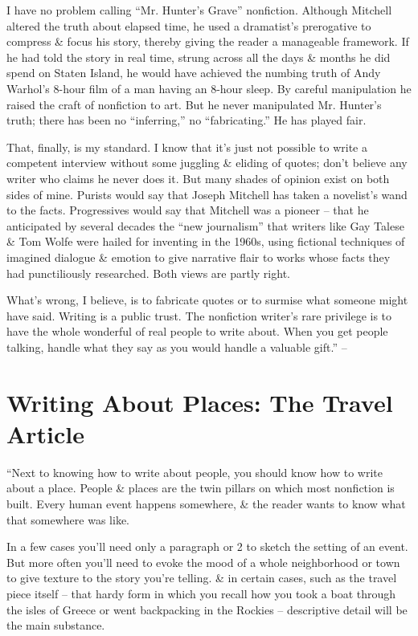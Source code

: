 \documentclass{article}
\begin{document}
I have no problem calling ``Mr. Hunter's Grave'' nonfiction. Although Mitchell altered the truth about elapsed time, he used a dramatist's prerogative to compress \& focus his story, thereby giving the reader a manageable framework. If he had told the story in real time, strung across all the days \& months he did spend on Staten Island, he would have achieved the numbing truth of Andy Warhol's 8-hour film of a man having an 8-hour sleep. By careful manipulation he raised the craft of nonfiction to art. But he never manipulated Mr. Hunter's truth; there has been no ``inferring,'' no ``fabricating.'' He has played fair.

That, finally, is my standard. I know that it's just not possible to write a competent interview without some juggling \& eliding of quotes; don't believe any writer who claims he never does it. But many shades of opinion exist on both sides of mine. Purists would say that Joseph Mitchell has taken a novelist's wand to the facts. Progressives would say that Mitchell was a pioneer -- that he anticipated by several decades the ``new journalism'' that writers like Gay Talese \& Tom Wolfe were hailed for inventing in the 1960s, using fictional techniques of imagined dialogue \& emotion to give narrative flair to works whose facts they had punctiliously researched. Both views are partly right.

What's wrong, I believe, is to fabricate quotes or to surmise what someone might have said. Writing is a public trust. The nonfiction writer's rare privilege is to have the whole wonderful of real people to write about. When you get people talking, handle what they say as you would handle a valuable gift.'' -- \cite[pp. 98--111]{Zinsser2016}


\section{Writing About Places: The Travel Article}
``Next to knowing how to write about people, you should know how to write about a place. People \& places are the twin pillars on which most nonfiction is built. Every human event happens somewhere, \& the reader wants to know what that somewhere was like.

In a few cases you'll need only a paragraph or 2 to sketch the setting of an event. But more often you'll need to evoke the mood of a whole neighborhood or town to give texture to the story you're telling. \& in certain cases, such as the travel piece itself -- that hardy form in which you recall how you took a boat through the isles of Greece or went backpacking in the Rockies -- descriptive detail will be the main substance.
\end{document}
